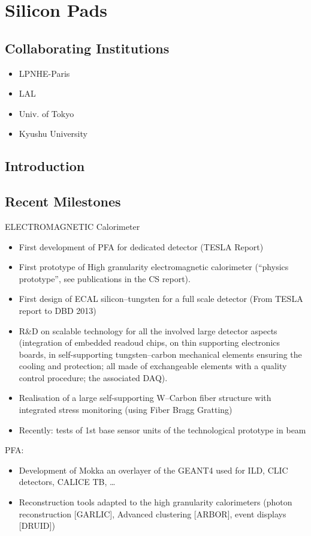 \section{Silicon Pads}
\subsection{Collaborating Institutions}
\begin{itemize}
	\item LPNHE-Paris
	\item LAL
	\item Univ. of Tokyo
	\item Kyushu University
\end{itemize}
\subsection{Introduction}
\subsection{Recent Milestones}
ELECTROMAGNETIC Calorimeter
\begin{itemize}
	\item First development of PFA for dedicated detector (TESLA Report)
	\item First prototype of High granularity electromagnetic calorimeter (``physics prototype'', see publications in the CS report).
	\item First design of ECAL silicon--tungsten for a full scale detector (From TESLA report to DBD 2013)
	\item R\&D on scalable technology for all the involved large detector aspects (integration of embedded readoud chips, on thin supporting electronics boards, in self-supporting tungsten--carbon mechanical elements ensuring the cooling and protection; all made of exchangeable elements with a quality control procedure; the associated DAQ).
	\item Realisation of a large self-supporting W--Carbon fiber structure with integrated stress monitoring (using Fiber Bragg Gratting) 
	\item Recently: tests of 1st base sensor units of the technological prototype in beam
\end{itemize}
PFA:
\begin{itemize}
	\item Development of Mokka an overlayer of the GEANT4 used for ILD, CLIC detectors, CALICE TB, \ldots
	\item Reconstruction tools adapted to the high granularity calorimeters (photon reconstruction [GARLIC], Advanced clustering [ARBOR], event displays [DRUID])
\end{itemize}

